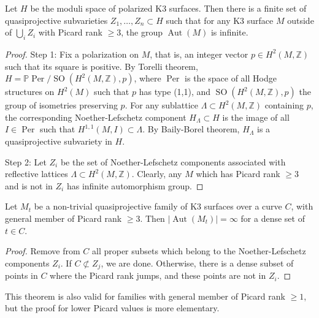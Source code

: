 \begin{lemma}
\label{lemma-noether-lefschetz-components}
Let $H$ be the moduli space of polarized K3
surfaces. Then there is a finite set of
quasiprojective subvarieties
$Z_1,\dots,Z_n \subset H$ such that for any K3
surface $M$ outside of $\bigcup_i Z_i$ with Picard
rank $\geq 3$, the group $\operatorname{Aut}(M)$ is
infinite.
\end{lemma}

\begin{proof}
Step 1: Fix a polarization on $M$, that is, an
integer vector $p \in H^2(M,\mathbb{Z})$ such that
its square is positive. By Torelli theorem,
$H=\mathbb{P}\operatorname{Per}/\operatorname{SO}(H^2(M,\mathbb{Z}),p)$,
where $\operatorname{Per}$ is the space of all Hodge
structures on $H^2(M)$ such that $p$ has type
(1,1), and $\operatorname{SO}(H^2(M,\mathbb{Z}),p)$
the group of isometries preserving $p$. For any
sublattice $\Lambda \subset H^2(M,\mathbb{Z})$
containing $p$, the corresponding
Noether-Lefschetz component $H_{\Lambda}\subset H$
is the image of all $I \in \operatorname{Per}$ such
that $H^{1,1}(M,I)\subset \Lambda$. By Baily-Borel
theorem, $H_{\Lambda}$ is a quasiprojective
subvariety in $H$.

Step 2: Let $Z_i$ be the set of Noether-Lefschetz
components associated with reflective lattices
$\Lambda \subset H^2(M,\mathbb{Z})$. Clearly, any
$M$ which has Picard rank $\geq 3$ and is not in
$Z_i$ has infinite automorphism group.
\end{proof}

\begin{theorem}[K. Oguiso, 2003]
\label{theorem-oguiso-2003}
Let $M_t$ be a non-trivial quasiprojective family
of K3 surfaces over a curve $C$, with general
member of Picard rank $\geq 3$. Then
$|\operatorname{Aut}(M_t)|=\infty$ for a dense set
of $t \in C$.
\end{theorem}

\begin{proof}
Remove from $C$ all proper subsets which belong to
the Noether-Lefschetz components $Z_i$. If
$C \not\subset Z_j$, we are done. Otherwise, there
is a dense subset of points in $C$ where the Picard
rank jumps, and these points are not in $Z_i$.
\end{proof}

\begin{remark}
\label{remark-oguiso-lower-picard}
This theorem is also valid for families with
general member of Picard rank $\geq 1$, but the
proof for lower Picard values is more elementary.
\end{remark}

